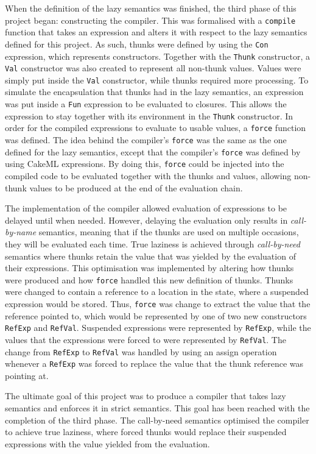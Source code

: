 When the definition of the lazy semantics was finished, the third phase of this
project began: constructing the compiler. This was formalised with a
\texttt{compile} function that takes an expression and alters it with respect to
the lazy semantics defined for this project. As such, thunks were defined by
using the \texttt{Con} expression, which represents constructors. Together with
the \texttt{Thunk} constructor, a \texttt{Val} constructor was also created to
represent all non-thunk values. Values were simply put inside the \texttt{Val}
constructor, while thunks required more processing. To simulate the
encapsulation that thunks had in the lazy semantics, an expression was put
inside a \texttt{Fun} expression to be evaluated to closures. This allows the
expression to stay together with its environment in the \texttt{Thunk}
constructor. In order for the compiled expressions to evaluate to usable values,
a \texttt{force} function was defined. The idea behind the compiler's
\texttt{force} was the same as the one defined for the lazy semantics, except
that the compiler's \texttt{force} was defined by using CakeML expressions.
By doing this, \texttt{force} could be injected into the compiled code to be
evaluated together with the thunks and values, allowing non-thunk values to be
produced at the end of the evaluation chain.

The implementation of the compiler allowed evaluation of expressions to be
delayed until when needed. However, delaying the evaluation only results in
\textit{call-by-name} semantics, meaning that if the thunks are used on multiple
occasions, they will be evaluated each time. True laziness is achieved through
\textit{call-by-need} semantics where thunks retain the value that was yielded
by the evaluation of their expressions. This optimisation was implemented by
altering how thunks were produced and how \texttt{force} handled this new
definition of thunks. Thunks were changed to contain a reference to a location
in the state, where a suspended expression would be stored. Thus, \texttt{force}
was change to extract the value that the reference pointed to, which would be
represented by one of two new constructors \texttt{RefExp} and \texttt{RefVal}.
Suspended expressions were represented by \texttt{RefExp}, while the values that
the expressions were forced to were represented by \texttt{RefVal}. The change
from \texttt{RefExp} to \texttt{RefVal} was handled by using an assign operation
whenever a \texttt{RefExp} was forced to replace the value that the thunk
reference was pointing at.

The ultimate goal of this project was to produce a compiler that takes lazy
semantics and enforces it in strict semantics. This goal has
been reached with the completion of the third phase. The call-by-need semantics
optimised the compiler to achieve true laziness, where forced thunks
would replace their suspended expressions with the value yielded from
the evaluation.
